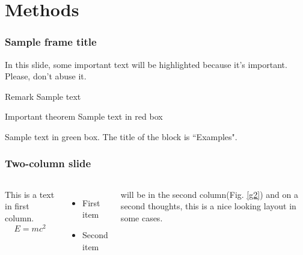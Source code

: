\documentclass[10pt]{beamer}
\begin{document}
	\section{Methods}
	\begin{frame}
		\frametitle{Sample frame title}
		
		In this slide, some important text will be
		\alert{highlighted} because it's important.
		Please, don't abuse it.
		
		\begin{block}{Remark}
			Sample text
		\end{block}
		
		\begin{alertblock}{Important theorem}
			Sample text in red box
		\end{alertblock}
		
		\begin{examples}
			Sample text in green box. The title of the block is ``Examples".
		\end{examples}
	\end{frame}
	\begin{frame}
		\frametitle{Two-column slide}
		\begin{columns}
			\column{0.5\textwidth} 
			This is a text in first column.
			$$E=mc^2$$
			\begin{itemize}
				\item First item
				\item Second item
			\end{itemize}
			
			\column{0.5\textwidth}
			{\small \textcite{kamilaris2018deep} will be in the second column(Fig. \ref{g2})
			and on a second thoughts\parencite{deng2014deep}, this is a nice looking
			layout in some cases\parencite{deng2014deep,kamilaris2018deep,mackenzie1992risk}.}
		\end{columns}
	\end{frame}
\end{document}

